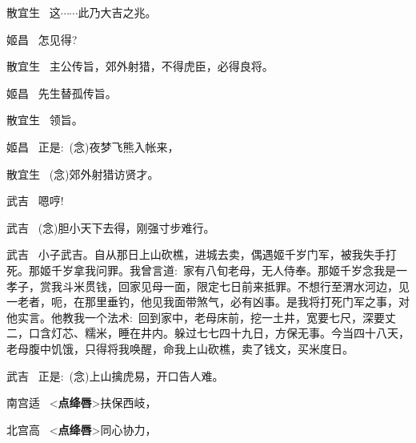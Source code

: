 {散宜生\hspace{20pt}~ 这$\cdots{}\cdots{}$此乃大吉之兆。

姬昌\hspace{30pt}~ 怎见得?

散宜生\hspace{20pt}~ 主公传旨，郊外射猎，不得虎臣，必得良将。

姬昌\hspace{30pt}~ 先生替孤传旨。

散宜生\hspace{20pt}~ 领旨。

姬昌\hspace{30pt}~ 正是:~({\akai 念})夜梦飞熊入帐来，

	散宜生\hspace{20pt}~ ({\akai 念})郊外射猎访贤才。

\vspace{5pt}

武吉\hspace{30pt}~ 嗯哼!

武吉\hspace{30pt}~ ({\akai 念})胆小天下去得，刚强寸步难行。

\setlength{\hangindent}{60pt}   %
{武吉\hspace{30pt}~ 小子武吉。自从那日上山砍樵，进城去卖，偶遇姬千岁门军，被我失手打死。那姬千岁拿我问罪。我曾言道:~家有八旬老母，无人侍奉。那姬千岁念我是一孝子，赏我斗米贯钱，回家见母一面，限定七日前来抵罪。不想行至渭水河边，见一老者，呃，在那里垂钓，他见我面带煞气，必有凶事。是我将打死门军之事，对他实言。他教我一个法术:~回到家中，老母床前，挖一土井，宽要七尺，深要丈二，口含灯芯、糯米，睡在井内。躲过七七四十九日，方保无事。今当四十八天，老母腹中饥饿，只得将我唤醒，命我上山砍樵，卖了钱文，买米度日。}

武吉\hspace{30pt}~ 正是:~({\akai 念})上山擒虎易，开口告人难。

\vspace{5pt}

	南宫适\hspace{20pt}~ \textless{}{\bfseries\akai 点绛唇}\textgreater{}扶保西岐，

北宫高\hspace{20pt}~  \textless{}{\bfseries\akai 点绛唇}\textgreater{}同心协力，

}
